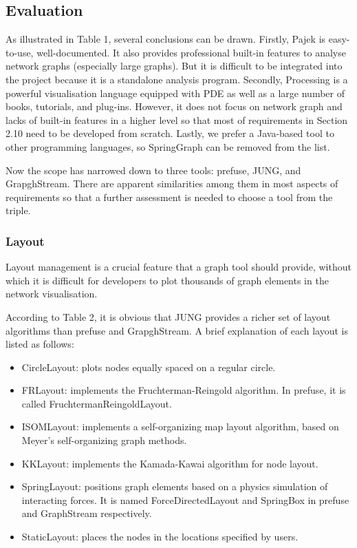 \subsection{Evaluation}
As illustrated in Table 1, several conclusions can be drawn. Firstly, Pajek is easy-to-use, well-documented. It also provides professional built-in features to analyse network graphs (especially large graphs). But it is difficult to be integrated into the project because it is a standalone analysis program. Secondly, Processing is a powerful visualisation language equipped with PDE as well as a large number of books, tutorials, and plug-ins. However, it does not focus on network graph and lacks of built-in features in a higher level so that most of requirements in Section 2.10 need to be developed from scratch. Lastly, we prefer a Java-based tool to other programming languages, so SpringGraph can be removed from the list.

Now the scope has narrowed down to three tools: prefuse, JUNG, and GrapghStream. There are apparent similarities among them in most aspects of requirements so that a further assessment is needed to choose a tool from the triple.

\subsubsection{Layout}
Layout management is a crucial feature that a graph tool should provide, without which it is difficult for developers to plot thousands of graph elements in the network visualisation.

According to Table 2, it is obvious that JUNG provides a richer set of layout algorithms than prefuse and GrapghStream. A brief explanation of each layout is listed as follows:
\begin{itemize}
  \item CircleLayout: plots nodes equally spaced on a regular circle.
  \item FRLayout: implements the Fruchterman-Reingold algorithm. In prefuse, it is called FruchtermanReingoldLayout.
  \item ISOMLayout: implements a self-organizing map layout algorithm, based on Meyer's self-organizing graph methods.
  \item KKLayout: implements the Kamada-Kawai algorithm for node layout.
  \item SpringLayout: positions graph elements based on a physics simulation of interacting forces. It is named ForceDirectedLayout and SpringBox in prefuse and GraphStream respectively.
  \item StaticLayout: places the nodes in the locations specified by users.
\end{itemize}
